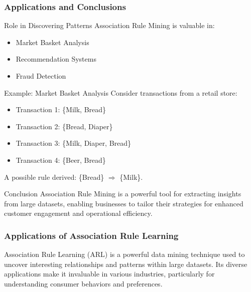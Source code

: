 \documentclass{beamer}
\begin{document}
\begin{frame}[fragile]
    \frametitle{Applications and Conclusions}
    \begin{block}{Role in Discovering Patterns}
        Association Rule Mining is valuable in:
        \begin{itemize}
            \item Market Basket Analysis
            \item Recommendation Systems
            \item Fraud Detection
        \end{itemize}
    \end{block}
    
    \begin{block}{Example: Market Basket Analysis}
        Consider transactions from a retail store:
        \begin{itemize}
            \item Transaction 1: \{Milk, Bread\}
            \item Transaction 2: \{Bread, Diaper\}
            \item Transaction 3: \{Milk, Diaper, Bread\}
            \item Transaction 4: \{Beer, Bread\}
        \end{itemize}
        A possible rule derived: \{Bread\} $\Rightarrow$ \{Milk\}.
    \end{block}
    
    \begin{block}{Conclusion}
        Association Rule Mining is a powerful tool for extracting insights from large datasets, enabling businesses to tailor their strategies for enhanced customer engagement and operational efficiency.
    \end{block}
\end{frame}

\begin{frame}[fragile]
    \frametitle{Applications of Association Rule Learning}
    Association Rule Learning (ARL) is a powerful data mining technique used to uncover interesting relationships and patterns within large datasets. Its diverse applications make it invaluable in various industries, particularly for understanding consumer behaviors and preferences.
\end{frame}
\end{document}
